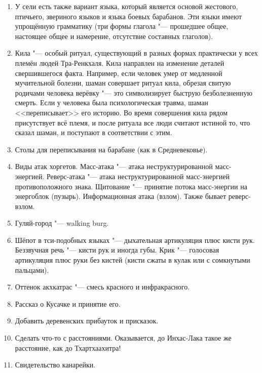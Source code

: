 \begin{enumerate}
\item У сели есть также вариант языка, который является основой жестового, птичьего, звериного языков и языка боевых барабанов.
Эти языки имеют упрощённую грамматику (три формы глагола "--- прошедшее общее, настоящее общее и намерение, отсутствие составных глаголов).

\item Кила "--- особый ритуал, существующий в разных формах практически у всех племён людей Тра-Ренкхаля.
Кила направлен на изменение деталей свершившегося факта.
Например, если человек умер от медленной мучительной болезни, шаман совершает ритуал кила, обрезая свитую родичами человека верёвку "--- это символизирует быструю безболезненную смерть.
Если у человека была психологическая травма, шаман <<переписывает>> его историю.
Во время совершения кила рядом присутствует всё племя, и после ритуала все люди считают истиной то, что сказал шаман, и поступают в соответствии с этим.

\item Столы для переписывания на барабане (как в Средневековье).

\item Виды атак хоргетов.
Масс-атака "--- атака неструктурированной масс-энергией.
Реверс-атака "--- атака неструктурированной масс-энергией противоположного знака.
Щитование "--- принятие потока масс-энергии на энергоблок (пузырь).
Информационная атака (взлом).
Также бывает реверс-взлом.

\item Гуляй-город "--- walking burg.

\item Шёпот в тси-подобных языках "--- дыхательная артикуляция плюс кисти рук.
Беззвучная речь "--- кисти рук и иногда губы.
Крик "--- голосовая артикуляция плюс руки без кистей (кисти сжаты в кулак или с сомкнутыми пальцами).

\item Оттенок акхкатрас "--- смесь красного и инфракрасного.

\item Рассказ о Кусачке и принятие его.

\item Добавить деревенских прибауток и присказок.

\item Сделать что-то с расстояниями.
Оказывается, до Инхас-Лака такое же расстояние, как до Тхартхаахитра!

\item Свидетельство канарейки.


\end{enumerate}
